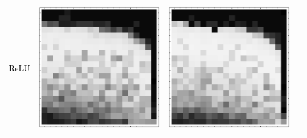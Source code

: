 \documentclass[10pt]{article}
\begin{document}
\begin{tabular}{|c|c|c|c|}
ReLU 
        & \includegraphics[scale=0.25]{plots/simple/LF-20R10R-20T10-MNIST-6.eps}
        & \includegraphics[scale=0.25]{plots/simple/LF-40R10R-20T10-MNIST-6.eps}

\end{tabular}
\end{document}
